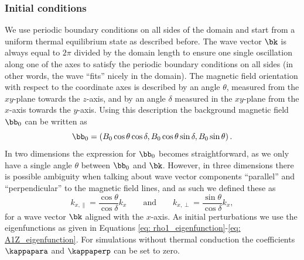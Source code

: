 \subsubsection{Initial conditions}
We use periodic boundary conditions on all sides of the domain and start from a uniform thermal equilibrium state as described before. The wave vector $\bk$ is always equal to $2\pi$ divided by the domain length to ensure one single oscillation along one of the axes to satisfy the periodic boundary conditions on all sides (in other words, the wave ``fits'' nicely in the domain). The magnetic field orientation with respect to the coordinate axes is described by an angle $\theta$, measured from the $xy$-plane towards the $z$-axis, and by an angle $\delta$ measured in the $xy$-plane from the $x$-axis towards the $y$-axis. Using this description the background magnetic field $\bb_0$ can be written as
\begin{equation}
  \bb_0 = \left(B_0\cos\theta\cos\delta, B_0\cos\theta\sin\delta, B_0\sin\theta\right).
\end{equation}
In two dimensions the expression for $\bb_0$ becomes straightforward, as we only have a single angle $\theta$ between $\bb_0$ and $\bk$. However, in three dimensions there is possible ambiguity when talking about wave vector components ``parallel'' and ``perpendicular'' to the magnetic field lines, and as such we defined these as
\begin{equation}
  k_{x, \parallel} = \frac{\cos\theta}{\cos\delta}k_x
  \qquad \text{and} \qquad
  k_{x, \perp} = \frac{\sin\theta}{\cos\delta}k_x,
\end{equation}
for a wave vector $\bk$ aligned with the $x$-axis. As initial perturbations we use the eigenfunctions as given in Equations \eqref{eq: rho1_eigenfunction}-\eqref{eq: A1Z_eigenfunction}. For simulations without thermal conduction the coefficients $\kappapara$ and $\kappaperp$ can be set to zero.

